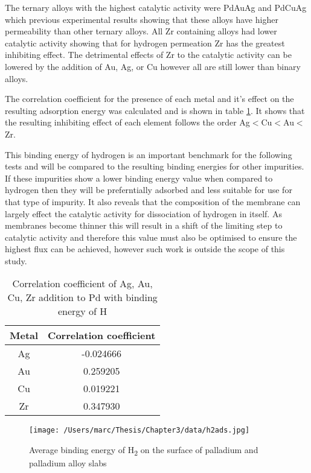 The ternary alloys with the highest catalytic activity were PdAuAg and PdCuAg which previous experimental results showing that these alloys have higher permeability than other ternary alloys. All Zr containing alloys had lower catalytic activity showing that for hydrogen permeation Zr has the greatest inhibiting effect. The detrimental effects of Zr to the catalytic activity can be lowered by the addition of Au, Ag, or Cu however all are still lower than binary alloys. 

The correlation coefficient for the presence of each metal and it's effect on the resulting adsorption energy was calculated and is shown in table \ref{corrH}. It shows that the resulting inhibiting effect of each element follows the order Ag$<$Cu$<$Au$<$Zr. 

This binding energy of hydrogen is an important benchmark for the following tests and will be compared to the resulting binding energies for other impurities. If these impurities show a lower binding energy value when compared to hydrogen then they will be preferntially adsorbed and less suitable for use for that type of impurity. It also reveals that the composition of the membrane can largely effect the catalytic activity for dissociation of hydrogen in itself. As membranes become thinner this will result in a shift of the limiting step to catalytic activity and therefore this value must also be optimised to ensure the highest flux can be achieved, however such work is outside the scope of this study. 

\begin{table}[]
  \centering
  \caption{Correlation coefficient of Ag, Au, Cu, Zr addition to Pd with binding energy of H}
  \label{corrH}
  \begin{tabular}{@{}cc@{}}
  \toprule
  Metal & Correlation coefficient \\ \midrule
  Ag    & -0.024666               \\
  Au    & 0.259205                \\
  Cu    & 0.019221                \\
  Zr    & 0.347930                \\ \bottomrule
  \end{tabular}
  \end{table}

\begin{landscape}
\begin{figure}
    \centering
    \texttt{[image: /Users/marc/Thesis/Chapter3/data/h2ads.jpg]}
    \caption{Average binding energy of H\textsubscript{2} on the surface of palladium and palladium alloy slabs}
    \label{h2ads}
  \end{figure}

\end{landscape}
